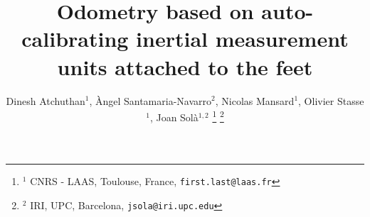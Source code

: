 \documentclass[letterpaper, 10 pt, conference]{ieeeconf}  %
\title{\LARGE \bf
Odometry based on auto-calibrating inertial measurement units attached to the feet
}
\author{Dinesh Atchuthan$^{1}$, \`Angel Santamaria-Navarro$^{2}$, Nicolas Mansard$^1$, Olivier Stasse$^1$, Joan Sol\`a$^{1,2}$%
\thanks{$^{1}$ CNRS - LAAS, Toulouse, France, \tt {\small first.last@laas.fr}}%
\thanks{$^{2}$ IRI, UPC, Barcelona, \tt{\small jsola@iri.upc.edu}}
}
\begin{document}
\maketitle
\thispagestyle{empty}
\pagestyle{empty}

\begin{abstract}

\end{abstract}











\end{document}
